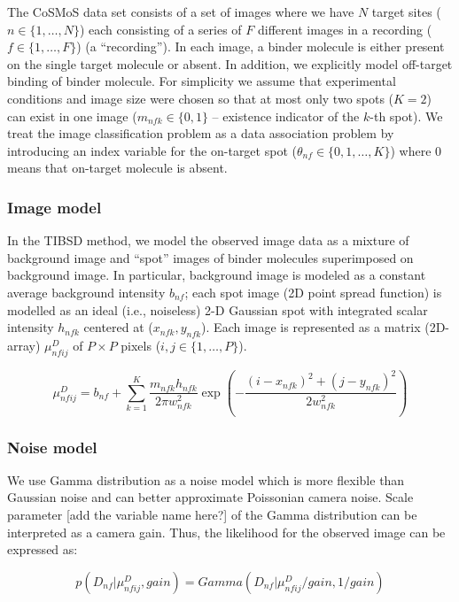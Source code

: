 The CoSMoS data set consists of a set of images where we have $N$ target sites ($n \in \{1,\dots,N\}$) each consisting of a series of $F$ different images in a recording ($f \in \{1,\dots,F\}$) (a “recording”). In each image, a binder molecule is either present on the single target molecule or absent. In addition, we explicitly model off-target binding of binder molecule. For simplicity  we assume that experimental conditions and image size were chosen so that at most only two spots ($K=2$) can exist in one image ($m_{nfk} \in \{ 0,1 \}$ -- existence indicator of the $k$-th spot). We treat the image classification problem as a data association problem by introducing an index variable for the on-target spot ($\theta_{nf} \in \{ 0,1,\dots,K \}$) where 0 means that on-target molecule is absent.

\subsubsection{Image model}

In the TIBSD method, we model the observed image data as a mixture of background image and “spot” images of binder molecules superimposed on background image. In particular, background image is modeled as a constant average background intensity $b_{nf}$; each spot image (2D point spread function) is modelled as an ideal (i.e., noiseless) 2-D Gaussian spot with integrated scalar intensity $h_{nfk}$ centered at ($x_{nfk}, y_{nfk}$). Each image is represented as a matrix (2D-array) $\mu^D_{nfij}$ of $P \times P$ pixels ($i,j \in \{1,\dots,P\}$). 

\textbf{\begin{equation*}
    \mu^{D}_{nfij} = b_{nf} + \sum_{k=1}^{K} \dfrac{m_{nfk}h_{nfk}}{2 \pi w^2_{nfk}} \exp{\left ( -\dfrac{(i-x_{nfk})^2 + (j-y_{nfk})^2}{2w^2_{nfk}} \right)}
\end{equation*}}

\subsubsection{Noise model}

 We use Gamma distribution as a noise model which is more flexible than Gaussian noise and can better approximate Poissonian camera noise. Scale parameter [add the variable name here?] of the Gamma distribution can be interpreted as a camera gain. Thus, the likelihood for the observed image can be expressed as:
 
 \begin{equation*}
     p(D_{nf}|\mu^D_{nfij},gain) = Gamma(D_{nf}|\mu^D_{nfij}/gain,1/gain)
 \end{equation*}

